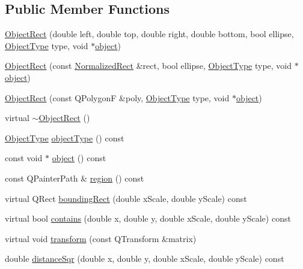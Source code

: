 \subsection*{Public Member Functions}
\begin{DoxyCompactItemize}
\item 
\hyperlink{classOkular_1_1ObjectRect_a699760a940f2476e917ff11cefcfab28}{Object\+Rect} (double left, double top, double right, double bottom, bool ellipse, \hyperlink{classOkular_1_1ObjectRect_a2f77f7653306bae90bfb68277aaafe16}{Object\+Type} type, void $\ast$\hyperlink{classOkular_1_1ObjectRect_abb2a3c95452ae753a33f3f5c73391374}{object})
\item 
\hyperlink{classOkular_1_1ObjectRect_a65a9d423f906eac141410d01266f063a}{Object\+Rect} (const \hyperlink{classOkular_1_1NormalizedRect}{Normalized\+Rect} \&rect, bool ellipse, \hyperlink{classOkular_1_1ObjectRect_a2f77f7653306bae90bfb68277aaafe16}{Object\+Type} type, void $\ast$\hyperlink{classOkular_1_1ObjectRect_abb2a3c95452ae753a33f3f5c73391374}{object})
\item 
\hyperlink{classOkular_1_1ObjectRect_ae7b64493a9fe8a99b637f6e5c7e7cb74}{Object\+Rect} (const Q\+Polygon\+F \&poly, \hyperlink{classOkular_1_1ObjectRect_a2f77f7653306bae90bfb68277aaafe16}{Object\+Type} type, void $\ast$\hyperlink{classOkular_1_1ObjectRect_abb2a3c95452ae753a33f3f5c73391374}{object})
\item 
virtual \hyperlink{classOkular_1_1ObjectRect_a98c6980903ab134d90d67e2d0942f7dd}{$\sim$\+Object\+Rect} ()
\item 
\hyperlink{classOkular_1_1ObjectRect_a2f77f7653306bae90bfb68277aaafe16}{Object\+Type} \hyperlink{classOkular_1_1ObjectRect_a1c61e4737530a2c15ad93c8764917a14}{object\+Type} () const 
\item 
const void $\ast$ \hyperlink{classOkular_1_1ObjectRect_abb2a3c95452ae753a33f3f5c73391374}{object} () const 
\item 
const Q\+Painter\+Path \& \hyperlink{classOkular_1_1ObjectRect_a9308d62ab90ca9cb21df729432e4cb92}{region} () const 
\item 
virtual Q\+Rect \hyperlink{classOkular_1_1ObjectRect_aa6b1c3b6ed093291d5ec7f92b97754ae}{bounding\+Rect} (double x\+Scale, double y\+Scale) const 
\item 
virtual bool \hyperlink{classOkular_1_1ObjectRect_aadc1a6f33f9af0f6da1fd94c07d52488}{contains} (double x, double y, double x\+Scale, double y\+Scale) const 
\item 
virtual void \hyperlink{classOkular_1_1ObjectRect_ae792b4a8ca659f7315173722a862e05f}{transform} (const Q\+Transform \&matrix)
\item 
double \hyperlink{classOkular_1_1ObjectRect_a9e1f6727b141e7cb86529dbc55120e81}{distance\+Sqr} (double x, double y, double x\+Scale, double y\+Scale) const 
\end{DoxyCompactItemize}

